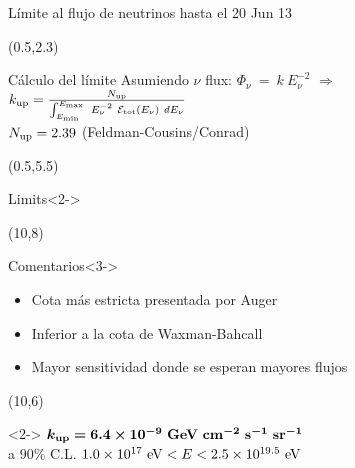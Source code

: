 \begin{frame}{L\'imite al flujo de neutrinos hasta el 20 Jun 13}
	\scriptsize
		\begin{textblock}{15}(0.5,2.3)
			\begin{alertblock}{C\'alculo del l\'imite}
				\centering
				Asumiendo $\nu$ flux: $\Phi_\nu ~ = ~ k ~ E_\nu^{-2}$ $\Rightarrow$ $k_{\rm up} = \frac{N_{\rm up}}{\int_{E_{\rm min}}^{E_{\rm max}}~E_{\nu}^{-2}~{\cal E}_{\rm tot}(E_\nu)~dE_\nu}$
				\\[2mm]
				$N_{\rm up} = 2.39$ (Feldman-Cousins/Conrad)
			\end{alertblock}
		\end{textblock}	
		
		\begin{textblock}{9}(0.5,5.5)
			\begin{block}{Limits}<2->
			\begin{overprint}
				\centerline{}
			\end{overprint}
			\end{block}
		\end{textblock}
		
		\begin{textblock}{5.6}(10,8)
			\begin{exampleblock}{Comentarios}<3->
				\begin{itemize}
				\item Cota m\'as estricta presentada por Auger
				\item Inferior a la cota de Waxman-Bahcall
				\item Mayor sensitividad donde se esperan mayores flujos
				\end{itemize}
			\end{exampleblock}
		\end{textblock}
% 		
		\begin{textblock}{5.6}(10,6)
			\begin{alertblock}{}<2->
			\centering
			\tiny
			$\bm{ k_{\rm up}=6.4 \times 10^{-9}~{\rm GeV~cm^{-2}~s^{-1}~sr^{-1}}}$
			\\ a $90\%$ C.L. $1.0\times10^{17}~{\rm eV}<E<2.5\times10^{19.5}~{\rm eV}$
			\end{alertblock}
		\end{textblock}
\end{frame}

